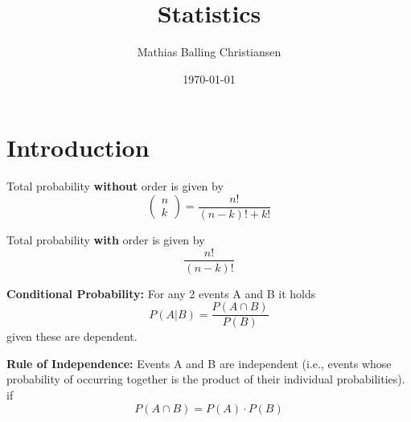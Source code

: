 \documentclass{article}
\title{Statistics}
\author{Mathias Balling Christiansen}
\date{\today}
\begin{document}
\maketitle
\tableofcontents
\newpage













\section{Introduction}
Total probability \textbf{without} order is given by
$$\begin{pmatrix}
  n\\
  k
\end{pmatrix}=\frac{n!}{(n-k)!+k!}$$

Total probability \textbf{with} order is given by
$$\frac{n!}{(n-k)!}$$



\textbf{Conditional Probability:}
For any 2 events A and B it holds
$$P(A|B)=\frac{P(A\cap B)}{P(B)}$$
given these are dependent.

\textbf{Rule of Independence:}
Events A and B are independent (i.e., events whose probability of occurring together is the product of their individual probabilities). if
$$P(A\cap B)=P(A)\cdot P(B)$$
\end{document}
